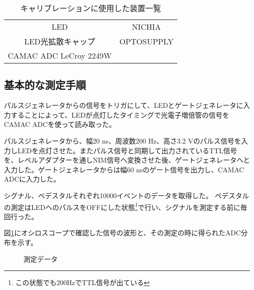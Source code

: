\documentclass[11pt]{ltjsreport}
\newcommand{\figref}[1]{図\ref{#1}}
\begin{document}

\begin{table}[htdp]
\caption{キャリブレーションに使用した装置一覧}
\begin{center}
\begin{tabular}{cc}
\hline \hline
LED & NICHIA \\
LED光拡散キャップ & OPTOSUPPLY\\
CAMAC ADC LeCroy 2249W\\
\hline \hline
\end{tabular}
\end{center}
\label{default}
\end{table}%
\fi


\subsection{基本的な測定手順}

パルスジェネレータからの信号をトリガにして、LEDとゲートジェネレータに入力することによって、LEDが点灯したタイミングで光電子増倍管の信号をCAMAC ADCを使って読み取った。

パルスジェネレータから、幅20 ns、周波数200 Hz、高さ3.2 Vのパルス信号を入力しLEDを点灯させた。またパルス信号と同期して出力されているTTL信号を、レベルアダプターを通しNIM信号へ変換させた後、ゲートジェネレータへと入力した。ゲートジェネレータからは幅60 nsのゲート信号を出力し、CAMAC ADCに入力した。

シグナル、ベデスタルそれぞれ10000イベントのデータを取得した。
ペデスタルの測定はLEDへのパルスをOFFにした状態\footnote{この状態でも200HzでTTL信号が出ている}で行い、シグナルを測定する前に毎回行った。

\figref{CalibMeasurement}にオシロスコープで確認した信号の波形と、その測定の時に得られたADC分布を示す。

\begin{figure}[htbp]
  \begin{minipage}{0.47\textwidth}
  \end{minipage}
\hfill%
  \begin{minipage}{0.47\textwidth}
  \end{minipage}
    \caption[測定データ]{測定データ}
  \label{CalibMeasurement}
\end{figure}
\end{document}
